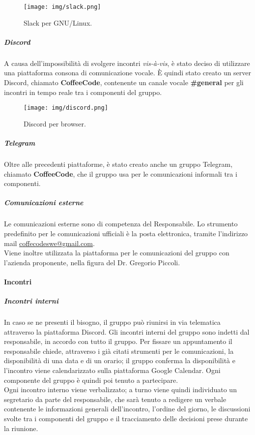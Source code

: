 \begin{figure}[H]
  \centering
  \texttt{[image: img/slack.png]}
  \label{fig:slack}
  \caption{Slack per GNU/Linux.}
\end{figure}

\subparagraph*{Discord}
A causa dell'impossibilità di svolgere incontri \textit{vis-à-vis}, è stato deciso di utilizzare una piattaforma consona di comunicazione vocale. È quindi stato creato un server Discord, chiamato \textbf{CoffeeCode}, contenente un canale vocale \textbf{\#general} per gli incontri in tempo reale tra i componenti del gruppo.

\begin{figure}[H]
  \centering
  \texttt{[image: img/discord.png]}
  \label{fig:discord}
  \caption{Discord per browser.}
\end{figure}

\subparagraph*{Telegram}
Oltre alle precedenti piattaforme, è stato creato anche un gruppo Telegram, chiamato \textbf{CoffeeCode}, che il gruppo usa per le comunicazioni informali tra i componenti.

\subparagraph{Comunicazioni esterne}
Le comunicazioni esterne sono di competenza del Responsabile. Lo strumento predefinito per le comunicazioni ufficiali è la posta elettronica, tramite l'indirizzo mail \href{coffecodeswe@gmail.com}{coffecodeswe@gmail.com}. \\
Viene inoltre utilizzata la piattaforma  per le comunicazioni del gruppo con l'azienda proponente, nella figura del Dr. Gregorio Piccoli.

\paragraph{Incontri}
\subparagraph{Incontri interni}
In caso se ne presenti il bisogno, il gruppo può riunirsi in via telematica attraverso la piattaforma Discord. Gli incontri interni del gruppo sono indetti dal responsabile, in accordo con tutto il gruppo. Per fissare un appuntamento il responsabile chiede, attraverso i già citati strumenti per le comunicazioni, la disponibilità di una data e di un orario; il gruppo conferma la disponibilità e l'incontro viene calendarizzato sulla piattaforma Google Calendar. Ogni componente del gruppo è quindi poi tenuto a partecipare. \\
Ogni incontro interno viene verbalizzato; a turno viene quindi individuato un segretario da parte del responsabile, che sarà tenuto a redigere un verbale contenente le informazioni generali dell'incontro, l'ordine del giorno, le discussioni svolte tra i componenti del gruppo e il tracciamento delle decisioni prese durante la riunione.

